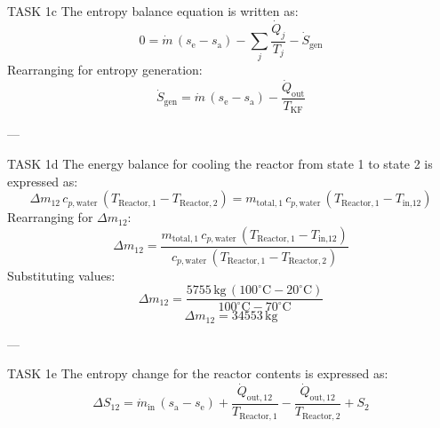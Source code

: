 TASK 1c  
The entropy balance equation is written as:  
\[
0 = \dot{m} \, (s_{\text{e}} - s_{\text{a}}) - \sum_j \frac{\dot{Q}_j}{T_j} - \dot{S}_{\text{gen}}
\]  
Rearranging for entropy generation:  
\[
\dot{S}_{\text{gen}} = \dot{m} \, (s_{\text{e}} - s_{\text{a}}) - \frac{\dot{Q}_{\text{out}}}{T_{\text{KF}}}
\]  

---

TASK 1d  
The energy balance for cooling the reactor from state 1 to state 2 is expressed as:  
\[
\Delta m_{12} \, c_{p,\text{water}} \, (T_{\text{Reactor},1} - T_{\text{Reactor},2}) = m_{\text{total},1} \, c_{p,\text{water}} \, (T_{\text{Reactor},1} - T_{\text{in,12}})
\]  
Rearranging for \( \Delta m_{12} \):  
\[
\Delta m_{12} = \frac{m_{\text{total},1} \, c_{p,\text{water}} \, (T_{\text{Reactor},1} - T_{\text{in,12}})}{c_{p,\text{water}} \, (T_{\text{Reactor},1} - T_{\text{Reactor},2})}
\]  
Substituting values:  
\[
\Delta m_{12} = \frac{5755 \, \text{kg} \, (100^\circ\text{C} - 20^\circ\text{C})}{100^\circ\text{C} - 70^\circ\text{C}}
\]  
\[
\Delta m_{12} = 34553 \, \text{kg}
\]  

---

TASK 1e  
The entropy change for the reactor contents is expressed as:  
\[
\Delta S_{12} = \dot{m}_{\text{in}} \, (s_{\text{a}} - s_{\text{e}}) + \frac{\dot{Q}_{\text{out},12}}{T_{\text{Reactor},1}} - \frac{\dot{Q}_{\text{out},12}}{T_{\text{Reactor},2}} + S_2
\]  
